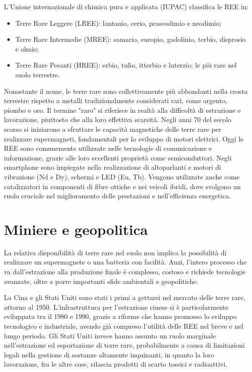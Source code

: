 \documentclass[12pt,a4paper,oneside]{book}
\begin{document}
L'Unione internazionale di chimica pura e applicata (IUPAC) classifica le REE in:
\begin{itemize}
	\item Terre Rare Leggere (LREE): lantanio, cerio, praseodimio e neodimio;
	\item Terre Rare Intermedie (MREE): samario, europio, gadolinio, terbio, disprosio e olmio;
	\item Terre Rare Pesanti (HREE): erbio, tulio, itterbio e luterzio; le più rare nel suolo terrestre.
\end{itemize}

Nonostante il nome, le terre rare sono collettivamente più abbondanti nella crosta terrestre rispetto a metalli tradizionalmente considerati rari, come argento, piombo e oro. Il termine "raro" si riferisce in realtà alla difficoltà di estrazione e lavorazione, piuttosto che alla loro effettiva scarsità.
Negli anni 70 del secolo scorso si iniziarono a sfruttare le capacità magnetiche delle terre rare per realizzare supermagneti, fondamentali per lo sviluppo di motori elettrici.
Oggi le REE sono comunemente utilizzate nelle tecnologie di comunicazione e informazione, grazie alle loro eccellenti proprietà come semiconduttori. Negli smartphone sono impiegate nella realizzazione di altoparlanti e motori di vibrazione (Nd e Dy), schermi e LED (Eu, Tb). Vengono utilizzate anche come catalizzatori in componenti di fibre ottiche e nei veicoli ibridi, dove svolgono un ruolo cruciale nel miglioramento delle prestazioni e nell'efficienza energetica.

\section{Miniere e geopolitica}
La relativa disponibilità di terre rare nel suolo non implica la possibilità di realizzare un supermagnete o una batteria con facilità. Anzi, l'intero processo che va dall'estrazione alla produzione finale è complesso, costoso e richiede tecnologie avanzate, oltre a porre importanti sfide ambientali e geopolitiche.

La Cina e gli Stati Uniti sono stati i primi a gettarsi nel mercato delle terre rare, attorno al 1950. L'infrastruttura per l'estrazione cinese si è particolarmente sviluppata tra il 1980 e 1990, grazie a riforme che hanno promosso lo sviluppo tecnologico e industriale, avendo già compreso l'utilità delle REE nel breve e nel lungo periodo. Gli Stati Uniti invece hanno assunto un ruolo marginale nell'estrazione ed esportazione di terre rare, probabilmente a causa di limitazioni legali nella gestione di sostanze altamente inquinanti, in quanto la loro lavorazione, fra le altre cose, rilascia prodotti di scarto tossici e radioattivi.
\end{document}

